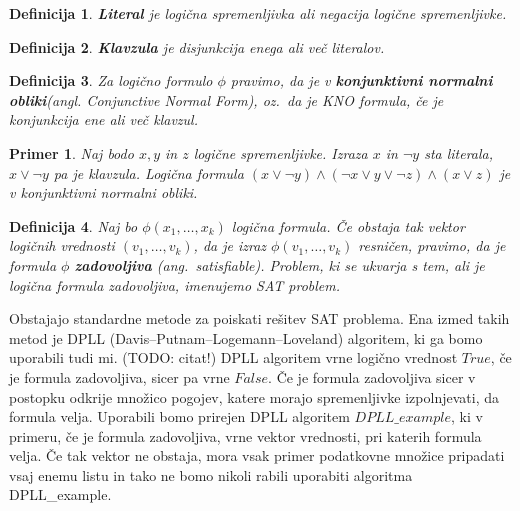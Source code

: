 \documentclass[12pt,a4paper]{article}
\newtheorem{definicija}{Definicija}
\newtheorem{primer}{Primer}
\begin{document}
\begin{definicija}
	\textbf{Literal} je logična spremenljivka ali negacija logične spremenljivke.
\end{definicija}

\begin{definicija}
	\textbf{Klavzula} je disjunkcija enega ali več literalov.
\end{definicija}

\begin{definicija}
	Za logično formulo $\phi$ pravimo, da je v \textbf{konjunktivni normalni obliki}(angl. Conjunctive Normal Form), 
	oz.~da je KNO formula, če je konjunkcija ene ali več klavzul.
\end{definicija}

\begin{primer}
	Naj bodo $x,y$ in $z$ logične spremenljivke. Izraza $x$ in $\lnot y$ sta literala, $x \lor \lnot y$ pa je klavzula.
	Logična formula $(x \lor \lnot y) \land (\lnot x \lor y \lor \lnot z) \land (x \lor z)$ je v konjunktivni normalni obliki.
\end{primer}

\begin{definicija}
	Naj bo $\phi(x_1,\ldots,x_k)$ logična formula.
	Če obstaja tak vektor logičnih vrednosti $(v_1, \ldots, v_k)$, da je izraz $\phi(v_1, \ldots, v_k)$ resničen,
	pravimo, da je formula $\phi$ \textbf{zadovoljiva} (ang.~satisfiable).
	Problem, ki se ukvarja s tem, ali je logična formula zadovoljiva, imenujemo SAT problem.
\end{definicija}

Obstajajo standardne metode za poiskati rešitev SAT problema. Ena izmed takih metod je DPLL (Davis--Putnam--Logemann--Loveland) algoritem, ki ga bomo uporabili tudi mi. (TODO: citat!)
DPLL algoritem vrne logično vrednost $True$, če je formula zadovoljiva, sicer pa vrne $False$. 
Če je formula zadovoljiva sicer v postopku odkrije množico pogojev, katere morajo spremenljivke izpolnjevati, da formula velja.
Uporabili bomo prirejen DPLL algoritem $DPLL\_example$, ki v primeru, če je formula zadovoljiva, vrne vektor vrednosti, pri katerih formula velja. 
Če tak vektor ne obstaja, mora vsak primer podatkovne množice pripadati vsaj enemu listu in tako ne bomo nikoli rabili uporabiti algoritma DPLL\_example. %
\end{document}
